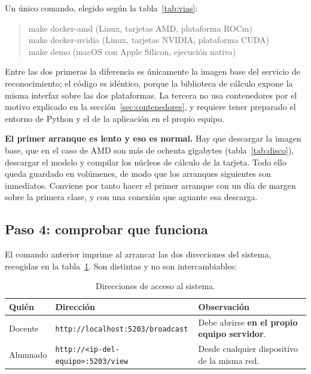 Un único comando, elegido según la tabla~\ref{tab:vias}:

\begin{quote}\ttfamily
make docker-amd \qquad\qquad\rmfamily(Linux, tarjetas AMD, plataforma ROCm)\\
\ttfamily make docker-nvidia \qquad\rmfamily(Linux, tarjetas NVIDIA, plataforma CUDA)\\
\ttfamily make demo \qquad\qquad\quad\rmfamily(macOS con Apple Silicon, ejecución nativa)
\end{quote}

Entre las dos primeras la diferencia es únicamente la imagen base del servicio de
reconocimiento; el código es idéntico, porque la biblioteca de cálculo expone la misma
interfaz sobre las dos plataformas. La tercera no usa contenedores por el motivo explicado
en la sección~\ref{sec:contenedores}, y requiere tener preparado el entorno de Python y
el de la aplicación en el propio equipo.

\textbf{El primer arranque es lento y eso es normal.} Hay que descargar la imagen base, que
en el caso de AMD son más de ochenta gigabytes (tabla~\ref{tab:disco}), descargar el modelo
y compilar los núcleos de cálculo de la tarjeta. Todo ello queda guardado en volúmenes, de
modo que los arranques siguientes son inmediatos. Conviene por tanto hacer el primer
arranque con un día de margen sobre la primera clase, y con una conexión que aguante esa
descarga.

\subsection*{Paso 4: comprobar que funciona}

El comando anterior imprime al arrancar las dos direcciones del sistema, recogidas en la
tabla~\ref{tab:direcciones}. Son distintas y no son intercambiables:

\begin{table}[H]
\centering
\footnotesize
\begin{tabular}{|l|l|p{6.2cm}|}
\hline
\textbf{Quién} & \textbf{Dirección} & \textbf{Observación} \\
\hline
Docente & \texttt{http://localhost:5203/broadcast} &
    Debe abrirse \textbf{en el propio equipo servidor}. \\
\hline
Alumnado & \texttt{http://<ip-del-equipo>:5203/view} &
    Desde cualquier dispositivo de la misma red. \\
\hline
\end{tabular}
\caption{Direcciones de acceso al sistema.}
\label{tab:direcciones}
\end{table}

